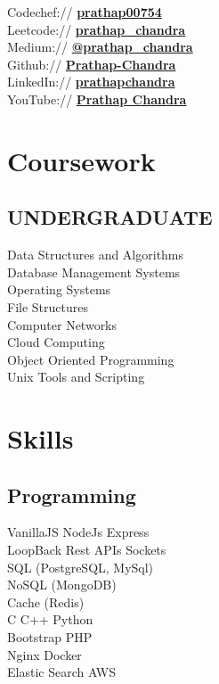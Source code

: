 \documentclass[]{deedy-resume-openfont}
\begin{document}
\begin{minipage}[t]{0.33\textwidth}
Codechef://  \href{https://www.codechef.com/users/prathap00754}{\bf prathap00754} \\
Leetcode://  \href{https://leetcode.com/prathap_chandra/}{\bf prathap\_chandra} \\
Medium:// \href{https://medium.com/@prathap_chandra/}{\bf @prathap\_chandra} \\
Github:// \href{https://github.com/Prathap-Chandra}{\bf Prathap-Chandra} \\
LinkedIn://  \href{https://www.linkedin.com/in/prathapchandra}{\bf prathapchandra} \\
YouTube://  \href{https://www.youtube.com/channel/UChfA9tIKEAduV_kxuHyAIkA}{\bf Prathap Chandra} \\

\sectionsep
\section{Coursework}
\subsection{UNDERGRADUATE}
Data Structures and Algorithms\\
Database Management Systems\\
Operating Systems\\
File Structures\\
Computer Networks\\
Cloud Computing\\
Object Oriented Programming\\
Unix Tools and Scripting\\
\sectionsep


\section{Skills}
\subsection{Programming}
\textbullet{} VanillaJS \textbullet{} NodeJs  \textbullet{} Express \\ 
\textbullet{} LoopBack \textbullet{} Rest APIs \textbullet{} Sockets\\ 
\textbullet{} SQL (PostgreSQL, MySql) \\
\textbullet{} NoSQL (MongoDB)\\
\textbullet{} Cache (Redis) \\ 
\textbullet{} C \textbullet{} C++ \textbullet{} Python\\
\textbullet{} Bootstrap \textbullet{} PHP\\
\textbullet{} Nginx \textbullet{} Docker \\ 
\textbullet{} Elastic Search \textbullet{} AWS\\
\sectionsep


\end{minipage}
\end{document}
